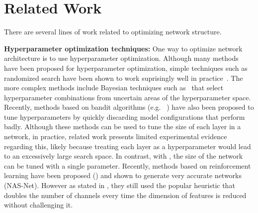 \section{Related Work}


There are several lines of work related to optimizing network structure. 


\noindent\textbf{Hyperparameter optimization techniques: }
One way to optimize network architecture is to use 
hyperparameter optimization. Although many methods have been 
proposed for hyperparameter optimization, simple techniques such as randomized
search have been shown to work suprisingly well in practice~\cite{BergstraJAMESBERGSTRA2012,Snoek12}.
The more complex methods include Bayesian techniques such as~\cite{Snoek12} that
select hyperparameter combinations from uncertain areas of the
hyperparameter space. 
Recently, methods based on bandit algorithms (e.g.
~\cite{li2016hyperband, jamieson2016}) have also been proposed to tune
hyperparameters by quickly discarding 
model configurations that perform badly. 
Although these methods can be used to tune the size of each layer in a network, 
in practice, related work presents limited experimental evidence
regarding this, likely because treating each layer as a hyperparameter
would lead to an excessively large search space.
In contrast, with \shrink, the size of the network can be tuned with 
a single parameter. Recently, methods based on reinforcement learning have been
proposed (\cite{Zoph2017b,Zoph2017a}) and shown to generate very accurate
networks (NAS-Net). However as stated in \cite{Zoph2017b}, they still used the popular
heuristic that doubles the number of channels every time the dimension of
features is reduced without challenging it.


